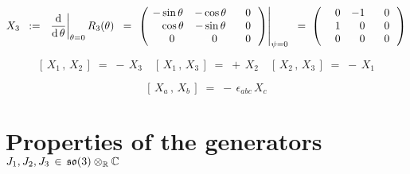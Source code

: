 \begin{equation*}
X_{3}
\;\; := \;\;
	\left.\dfrac{\d}{\d\,\theta}\right\vert_{\theta = 0} R_{3}(\theta)
\;\; = \;
	\left.\left(\!
		\begin{array}{ccc}
			{\color{black}-}\sin\theta & {\color{black}-}\cos\theta & {\color{white}-}0 \\
			{\color{white}-}\cos\theta & {\color{black}-}\sin\theta & {\color{white}-}0 \\
			{\color{white}-}0 & {\color{white}-}0 & {\color{white}-}0 \\
			\end{array}
		\,\right)\right\vert_{\psi = 0}
\;\; = \;
	\left(
		\begin{array}{ccc}
			{\color{white}-}0 & {\color{black}-}1 & {\color{white}-}0 \\
			{\color{white}-}1 & {\color{white}-}0 & {\color{white}-}0 \\
			{\color{white}-}0 & {\color{white}-}0 & {\color{white}-}0 \\
			\end{array}
		\,\right)
\end{equation*}

\vskip 0.5cm
\begin{equation*}
\left[\,X_{1}\,,\,X_{2}\,\right] \;=\; -\,X_{3}
\quad
\left[\,X_{1}\,,\,X_{3}\,\right] \;=\; +\,X_{2}
\quad
\left[\,X_{2}\,,\,X_{3}\,\right] \;=\; -\,X_{1}
\end{equation*}

\vskip 0.5cm
\begin{equation*}
\left[\,X_{a}\,,\,X_{b}\,\right] \;=\; -\,\epsilon_{abc}\,X_{c}
\end{equation*}


\vskip 0.5cm
\section{Properties of the generators \,$J_{1}, J_{2}, J_{3} \,\in\, \mathfrak{so}(3) \otimes_{\mathbb{R}} \mathbb{C}$}


